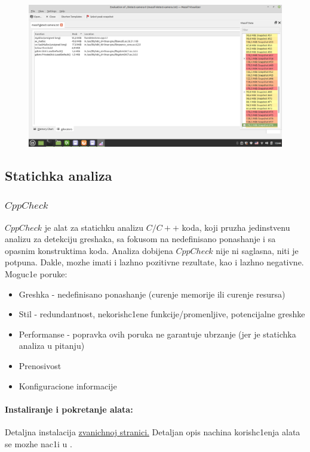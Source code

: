 \documentclass{article}
\begin{document}
\begin{figure}[H]
    \centering
    \includegraphics[width=12cm]{img/massif/massif_detect_camera_allocators.png}
    \caption{}
    \label{dcma:massif}
\end{figure}


\subsection{Statichka analiza}
\subsubsection{$CppCheck$}
$CppCheck$ je alat za statichku analizu $C/C++$ koda, koji pruzha jedinstvenu analizu za detekciju greshaka, sa fokusom na nedefinisano ponashanje i sa opasnim konstruktima koda. Analiza dobijena $CppCheck$ nije ni saglasna, niti je potpuna. Dakle, mozhe imati i lazhno pozitivne rezultate, kao i lazhno negativne.
Moguc1e poruke:
\begin{itemize}
    \item Greshka - nedefinisano ponashanje (curenje memorije ili curenje resursa)
    \item Stil - redundantnost, nekorish\-c1ene funkcije/promenljive, potencijalne greshke
    \item Performanse - popravka ovih poruka ne garantuje ubrzanje (jer je statichka analiza u pitanju)
    \item Prenosivost
    \item Konfiguracione informacije
\end{itemize}
\paragraph*{Instaliranje i pokretanje alata:}
Detaljna instalacija 
\href{https://cppcheck.sourceforge.io/}{zvanichnoj stranici.} 
Detaljan opis nachina korish\-c1enja alata se mozhe nac1i u \cite{cppCheckMan}.
\end{document}
